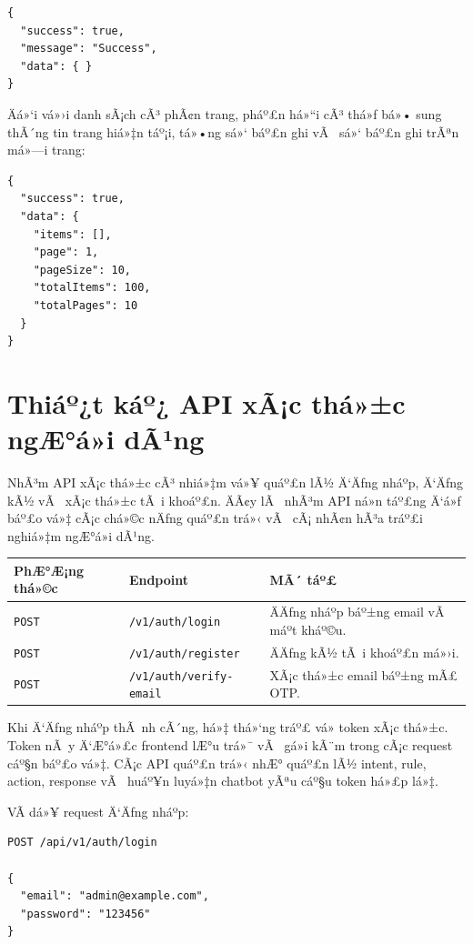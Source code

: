 ﻿\documentclass[12pt,a4paper]{report}
\begin{document}
\begin{verbatim}
{
  "success": true,
  "message": "Success",
  "data": { }
}
\end{verbatim}

Äá»‘i vá»›i danh sÃ¡ch cÃ³ phÃ¢n trang, pháº£n há»“i cÃ³ thá»ƒ bá»• sung thÃ´ng tin trang hiá»‡n táº¡i, tá»•ng sá»‘ báº£n ghi vÃ  sá»‘ báº£n ghi trÃªn má»—i trang:

\begin{verbatim}
{
  "success": true,
  "data": {
    "items": [],
    "page": 1,
    "pageSize": 10,
    "totalItems": 100,
    "totalPages": 10
  }
}
\end{verbatim}

\section{Thiáº¿t káº¿ API xÃ¡c thá»±c ngÆ°á»i dÃ¹ng}

NhÃ³m API xÃ¡c thá»±c cÃ³ nhiá»‡m vá»¥ quáº£n lÃ½ Ä‘Äƒng nháº­p, Ä‘Äƒng kÃ½ vÃ  xÃ¡c thá»±c tÃ i khoáº£n. ÄÃ¢y lÃ  nhÃ³m API ná»n táº£ng Ä‘á»ƒ báº£o vá»‡ cÃ¡c chá»©c nÄƒng quáº£n trá»‹ vÃ  cÃ¡ nhÃ¢n hÃ³a tráº£i nghiá»‡m ngÆ°á»i dÃ¹ng.

\begin{longtable}{|p{3cm}|p{5cm}|p{7cm}|}
\hline
\textbf{PhÆ°Æ¡ng thá»©c} & \textbf{Endpoint} & \textbf{MÃ´ táº£} \\
\hline
\texttt{POST} & \texttt{/v1/auth/login} & ÄÄƒng nháº­p báº±ng email vÃ  máº­t kháº©u. \\
\hline
\texttt{POST} & \texttt{/v1/auth/register} & ÄÄƒng kÃ½ tÃ i khoáº£n má»›i. \\
\hline
\texttt{POST} & \texttt{/v1/auth/verify-email} & XÃ¡c thá»±c email báº±ng mÃ£ OTP. \\
\hline
\end{longtable}

Khi Ä‘Äƒng nháº­p thÃ nh cÃ´ng, há»‡ thá»‘ng tráº£ vá» token xÃ¡c thá»±c. Token nÃ y Ä‘Æ°á»£c frontend lÆ°u trá»¯ vÃ  gá»­i kÃ¨m trong cÃ¡c request cáº§n báº£o vá»‡. CÃ¡c API quáº£n trá»‹ nhÆ° quáº£n lÃ½ intent, rule, action, response vÃ  huáº¥n luyá»‡n chatbot yÃªu cáº§u token há»£p lá»‡.

VÃ­ dá»¥ request Ä‘Äƒng nháº­p:

\begin{verbatim}
POST /api/v1/auth/login

{
  "email": "admin@example.com",
  "password": "123456"
}
\end{verbatim}
\end{document}
